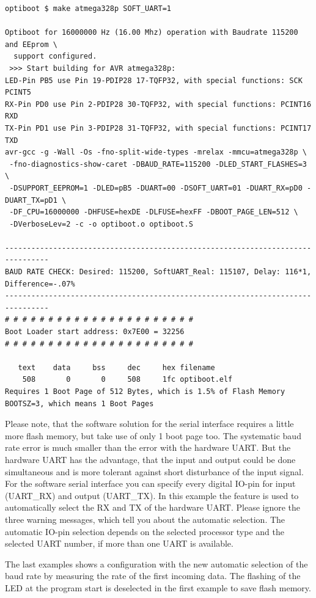 \begin{verbatim}
optiboot $ make atmega328p SOFT_UART=1

Optiboot for 16000000 Hz (16.00 Mhz) operation with Baudrate 115200 and EEprom \
  support configured.
 >>> Start building for AVR atmega328p:
LED-Pin PB5 use Pin 19-PDIP28 17-TQFP32, with special functions: SCK PCINT5
RX-Pin PD0 use Pin 2-PDIP28 30-TQFP32, with special functions: PCINT16 RXD
TX-Pin PD1 use Pin 3-PDIP28 31-TQFP32, with special functions: PCINT17 TXD
avr-gcc -g -Wall -Os -fno-split-wide-types -mrelax -mmcu=atmega328p \
 -fno-diagnostics-show-caret -DBAUD_RATE=115200 -DLED_START_FLASHES=3 \
 -DSUPPORT_EEPROM=1 -DLED=pB5 -DUART=00 -DSOFT_UART=01 -DUART_RX=pD0 -DUART_TX=pD1 \
 -DF_CPU=16000000 -DHFUSE=hexDE -DLFUSE=hexFF -DBOOT_PAGE_LEN=512 \
 -DVerboseLev=2 -c -o optiboot.o optiboot.S

--------------------------------------------------------------------------------
BAUD RATE CHECK: Desired: 115200, SoftUART_Real: 115107, Delay: 116*1, Difference=-.07%
--------------------------------------------------------------------------------
# # # # # # # # # # # # # # # # # # # # # #
Boot Loader start address: 0x7E00 = 32256
# # # # # # # # # # # # # # # # # # # # # #

   text    data     bss     dec     hex filename
    508       0       0     508     1fc optiboot.elf
Requires 1 Boot Page of 512 Bytes, which is 1.5% of Flash Memory
BOOTSZ=3, which means 1 Boot Pages

\end{verbatim}

Please note, that the software solution for the serial interface requires a little more flash memory,
but take use of only 1 boot page too. The systematic baud rate error is much smaller than the error with the hardware UART.
But the hardware UART has the advantage, that the input and output could be done simultaneous and is more tolerant against
short disturbance of the input signal.
For the software serial interface you can specify every digital IO-pin for input (UART\_RX) and output (UART\_TX). 
In this example the feature is used to automatically select the RX and TX of the hardware UART.
Please ignore the three warning messages, which tell you about the automatic selection.
The automatic IO-pin selection depends on the selected processor type and the selected UART number, if more than
one UART is available.


The last examples shows a configuration with the new automatic selection of the baud rate
by measuring the rate of the first incoming data.
The flashing of the LED at the program start is deselected in the first example to save flash memory.

